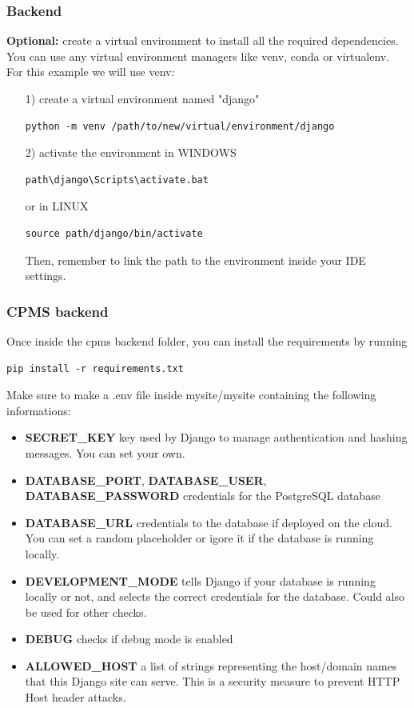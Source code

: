 \documentclass[table, 12pt]{article}
\begin{document}
\subsubsection{Backend}
\textbf{Optional:} create a virtual environment to install all the required dependencies.
You can use any virtual environment managers like venv, conda or virtualenv.
For this example we will use venv:
\begin{itemize}
    \item[1)] create a virtual environment named "django"
    \begin{lstlisting}[language=shell]
        python -m venv /path/to/new/virtual/environment/django
    \end{lstlisting}
    
    \item[2)] activate the environment in WINDOWS
    \begin{lstlisting}[language=shell]
        path\django\Scripts\activate.bat
    \end{lstlisting}
    or in LINUX
    \begin{lstlisting}[language=shell]
        source path/django/bin/activate
    \end{lstlisting}

Then, remember to link the path to the environment inside your IDE settings.
\end{itemize}

\subsubsection{CPMS backend}
Once inside the cpms backend folder, you can install the requirements by running
\begin{lstlisting}[language=shell]
    pip install -r requirements.txt
\end{lstlisting}
Make sure to make a .env file inside mysite/mysite containing the following informations:
\begin{itemize}
    \item  \textbf{SECRET\_KEY} key used by Django to manage authentication and hashing messages. You can set your own.
    \item   \textbf{DATABASE\_PORT}, \textbf{DATABASE\_USER}, \textbf{DATABASE\_PASSWORD} credentials for the PostgreSQL database
    \item   \textbf{DATABASE\_URL} credentials to the database if deployed on the cloud. You can set a random placeholder or igore it if the database is running locally.
    \item   \textbf{DEVELOPMENT\_MODE} tells Django if your database is running locally or not, and selects the correct credentials for the database. Could also be used for other checks.
    \item   \textbf{DEBUG} checks if debug mode is enabled
    \item   \textbf{ALLOWED\_HOST} a list of strings representing the host/domain names that this Django site can serve. This is a security measure to prevent HTTP Host header attacks.\
\end{itemize}
\end{document}
